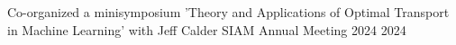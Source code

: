 

\begingroup
\begin{cvservices}

\cvservice
    {Co-organized a minisymposium 'Theory and Applications of Optimal Transport in Machine Learning' with Jeff Calder} %
    {SIAM Annual Meeting 2024}
    {2024} %
\end{cvservices}
\endgroup

